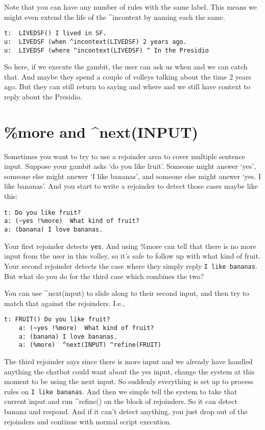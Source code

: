 \documentclass[]{article}
\begin{document}
Note that you can have any number of rules with the same label. This
means we might even extend the life of the \^{}incontext by naming each
the same.

\begin{verbatim}
t:  LIVEDSF() I lived in SF.
u:  LIVEDSF (when ^incontext(LIVEDSF) 2 years ago.
u:  LIVEDSF (where ^incontext(LIVEDSF) ^ In the Presidio 
\end{verbatim}

So here, if we execute the gambit, the user can ask us when and we can
catch that. And maybe they spend a couple of volleys talking about the
time 2 years ago. But they can still return to saying and where and we
still have context to reply about the Presidio.

\section{\%more and \^{}next(INPUT)}\label{more-and-nextinput}

Sometimes you want to try to use a rejoinder area to cover multiple
sentence input. Suppose your gambit asks `do you like fruit'. Someone
might answer `yes', someone else might answer `I like bananas', and
someone else might answer `yes. I like bananas'. And you start to write
a rejoinder to detect those cases maybe like this:

\begin{verbatim}
t: Do you like fruit?
a: (~yes !%more)  What kind of fruit?
a: (banana) I love bananas.
\end{verbatim}

Your first rejoinder detects \texttt{yes}. And using \%more can tell
that there is no more input from the user in this volley, so it's safe
to follow up with what kind of fruit. Your second rejoinder detects the
case where they simply reply \texttt{I\ like\ bananas}. But what do you
do for the third case which combines the two?

You can use \^{}next(input) to slide along to their second input, and
then try to match that against the rejoinders. I.e.,

\begin{verbatim}
t: FRUIT() Do you like fruit?
    a: (~yes !%more)  What kind of fruit?
    a: (banana) I love bananas.
    a: (%more)  ^next(INPUT) ^refine(FRUIT)
\end{verbatim}

The third rejoinder says since there is more input and we already have
handled anything the chatbot could want about the yes input, change the
system at this moment to be using the next input. So suddenly everything
is set up to process rules on \texttt{I\ like\ bananas}. And then we
simple tell the system to take that current input and run \^{}refine()
on the block of rejoinders. So it can detect banana and respond. And if
it can't detect anything, you just drop out of the rejoinders and
continue with normal script execution.
\end{document}
